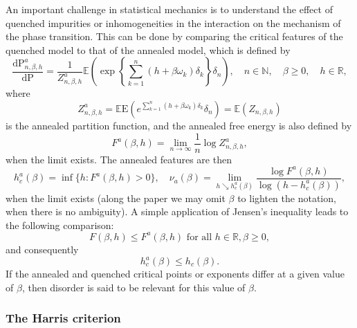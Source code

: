 \documentclass[AHL,Unicode,longabstracts]{cedram}
\newcommand{\bbE}{{\ensuremath{\mathbb E}}}
\newcommand{\bbN}{{\ensuremath{\mathbb N}}}
\newcommand{\bbR}{{\ensuremath{\mathbb R}}}
\newcommand{\gb}{\beta}
\newcommand{\gd}{\delta}
\newcommand{\go}{\omega}
\newcommand{\dd}{\mathrm{d}}
\newcommand{\R}{\mathbb{R}}
\newcommand\bP{\ensuremath{\mathrm{P}}}
\newcommand\bE{\ensuremath{\mathrm{E}}}
\begin{document}
An important challenge in statistical mechanics is to understand the effect of quenched impurities or inhomogeneities in the interaction on the mechanism of the phase transition. This can be done by comparing the critical features of the quenched model to that of the annealed model, which is defined by
\begin{equation}\label{eq:defannmeas}
\frac{\dd \bP^a_{n,\gb,h}}{\dd \bP} = \frac{1}{Z^a_{n,\gb,h}} \bbE\left(\exp \left\{ \sum_{k=1}^n (h + \gb \go_k) \gd_k \right\} \gd_n \right), \quad n \in \bbN, \quad \gb \geq 0,\quad h \in \bbR,
\end{equation}
where
\begin{equation}\label{eq:defannpf}
Z^a_{n,\gb,h} = \bbE\bE\left(e^{\sum_{k=1}^n (h+ \gb \go_k)\gd_k} \gd_n\right) = \bbE (Z_{n, \gb, h})
\end{equation}
is the annealed partition function, and the annealed free energy is also defined by
\begin{equation}
F^a(\gb,h) = \lim_{n \to \infty} \frac{1}{n} \log Z^a_{n,\gb,h},
\end{equation}
when the limit exists. The annealed features are then
\begin{equation}
h^a_c(\gb) = \inf\{h \colon F^a(\gb,h) > 0\}, \quad \nu_a(\gb) = \lim_{h \searrow h_c^a(\gb)} \frac{\log F^a(\gb,h)}{\log (h - h_c^a(\gb))},
\end{equation}
when the limit exists (along the paper we may omit $\beta$ to lighten the notation, when there is no ambiguity). A simple application of Jensen's inequality leads to the following comparison:
\begin{equation}
F(\gb,h) \leq F^a(\gb,h) \text{ for all } h\in \R, \gb\ge0,
\end{equation}
and consequently
\begin{equation}
h_c^a(\gb) \leq h_c(\gb).
\end{equation}
If the annealed and quenched critical points or exponents differ at a given value of $\gb$, then disorder is said to be relevant for this value of $\beta$.

\subsubsection{The Harris criterion}
\end{document}
